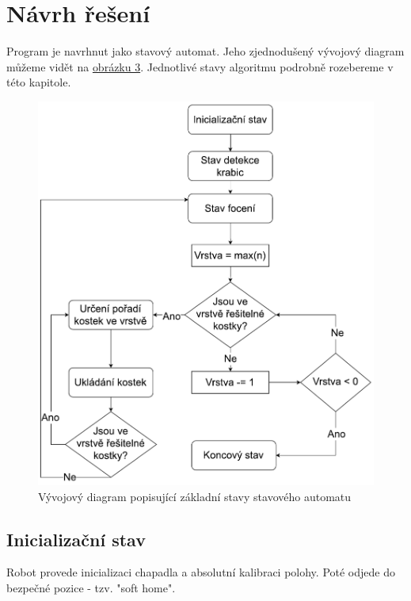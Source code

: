 \documentclass[journal,twoside,web]{ieeecolor}
\begin{document}
\section{Návrh řešení}
Program je navrhnut jako stavový automat. Jeho zjednodušený vývojový diagram můžeme vidět na \hyperlink{diagram1}{obrázku 3}.
Jednotlivé stavy algoritmu podrobně rozebereme v této kapitole.


\begin{figure}[h!]
    \centering
    \hypertarget{diagram1}{}
    \includegraphics[width=\linewidth]{flowchart_cropped}
    \caption{Vývojový diagram popisující základní stavy stavového automatu}
    \label{fig:flowchart}
\end{figure}

\subsection{Inicializační stav}
Robot provede inicializaci chapadla a absolutní kalibraci polohy. Poté odjede do bezpečné pozice - tzv. "soft home".
\end{document}
